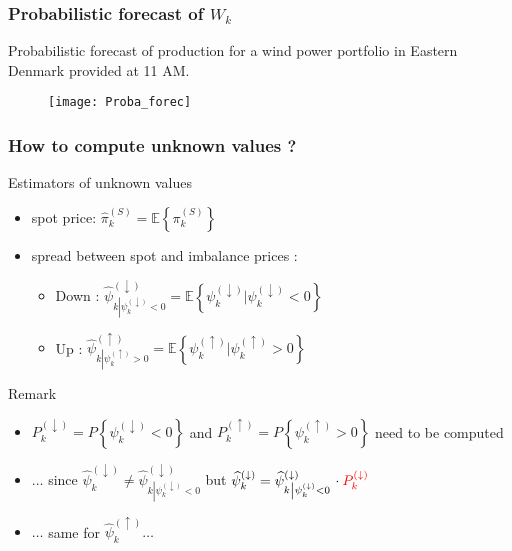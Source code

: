 \begin{frame}\frametitle{Probabilistic forecast of $W_k$}
\begin{exampleblock}{Probabilistic forecast of production for a wind power portfolio in Eastern Denmark provided at 11 AM.}
  \begin{figure}
    \centering
      \texttt{[image: Proba\_forec]}
  \end{figure}
\end{exampleblock}
\end{frame}


\begin{frame}\frametitle{How to compute unknown values ?}
\begin{block}{Estimators of unknown values}
  \begin{itemize}
    \item spot price: $\widehat { \pi } _ { k } ^ { ( S ) } = \mathbb { E } \left\{ \pi _ { k } ^ { ( S ) } \right\}$
    \item spread between spot and imbalance prices :
\begin{itemize}
  \item Down : $\widehat { \psi } _ { k \left| \psi _ { k } ^ { ( \downarrow ) } < 0 \right. } ^ { ( \downarrow ) } = \mathbb { E } \left\{ \psi _ { k } ^ { ( \downarrow ) } | \psi _ { k } ^ { ( \downarrow ) } < 0 \right\}$
  \item Up : $\widehat { \psi } _ { k \left| \psi _ { k } ^ { ( \uparrow ) } > 0 \right. } ^ { ( \uparrow ) } = \mathbb { E } \left\{ \psi _ { k } ^ { ( \uparrow ) } | \psi _ { k } ^ { ( \uparrow ) } > 0 \right\}$
\end{itemize}
  \end{itemize}
\end{block}

\begin{block}{Remark}
  \begin{itemize}
    \item $P _ { k } ^ { ( \downarrow ) } = P \left\{ \psi _ { k } ^ { ( \downarrow ) } < 0 \right\}$ and $P _ { k } ^ { ( \uparrow ) } = P \left\{ \psi _ { k } ^ { ( \uparrow ) } > 0 \right\}$ need to be computed
    \item $\ldots$ since $\widehat { \psi } _ { k } ^ { ( \downarrow ) } \neq \widehat { \psi } _ { k \left| \psi _ { k } ^ { ( \downarrow ) } <0\right. } ^ { ( \downarrow ) } $ but $\widehat { \psi } _ { k } ^ { ( \downarrow ) } = \widehat { \psi } _ { k \left| \psi _ { k } ^ { ( \downarrow ) } < 0 \right. } ^ { ( \downarrow ) }\cdot  {\color{red} P _ { k } ^ { ( \downarrow ) }}$
    \item $\ldots$ same for $\widehat { \psi } _ { k } ^ { ( \uparrow ) } \ldots$
  \end{itemize}
\end{block}
\end{frame}


